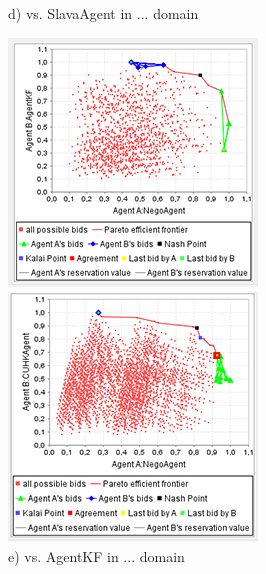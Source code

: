 \documentclass[html]{report}    %
\begin{document}
\begin{figure}
\begin{minipage}{.3\textwidth}
  \caption*{d) vs. SlavaAgent in ... domain}
\end{minipage}
\begin{minipage}{.3\textwidth}
  \centering
  \includegraphics[width=.9\linewidth]{5}
  \caption*{e) vs. AgentKF in ... domain}
\end{minipage}
\begin{minipage}{.3\textwidth}
  \centering
  \includegraphics[width=.9\linewidth]{6}

\end{minipage}
\end{figure}
\end{document}
